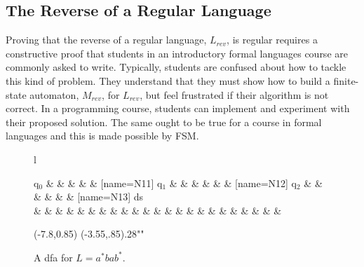 \documentclass{eptcs}
\begin{document}
\subsection{The Reverse of a Regular Language}
Proving that the reverse of a regular language, $L_{rev}$, is regular requires a constructive proof that students in an introductory formal languages course are commonly asked to write. Typically, students are confused about how to tackle this kind of problem. They understand that they must show how to build a finite-state automaton, $M_{rev}$, for $L_{rev}$, but feel frustrated if their algorithm is not correct. In a programming course, students can implement and experiment with their proposed solution. The same ought to be true for a course in formal languages and this is made possible by \textsf{FSM}.

\newcommand{\reverse}{
\begin{psmatrix}[rowsep=.5cm,colsep=.2cm,mnode=circle,fillstyle=solid,fillcolor=LightBlue]
             [name=N10] q$_0$ & & & & &  [name=N11] q$_1$  & & & & & &  [name=N12] q$_2$ & & & & & &  [name=N13] ds \\
             & & & & & & & & & & & & & & & & & & & & & & &
\end{psmatrix}

}
\begin{figure}[t]
\begin{center}
\begin{tabular}{l}
  \reverse
  \rput(-7.8,0.85){\psframebox*[framearc=.1]{$>$}}
  \cnode(-3.55,.85){.28}{""}

\end{tabular}
\caption{A \textsf{dfa} for $L = a^*bab^*$.}
\label{Ldfsa}
\end{center}
\end{figure}

\newcommand{\reversec}{
\begin{psmatrix}[rowsep=.7cm,colsep=.2cm,mnode=circle,fillstyle=solid,fillcolor=LightBlue]
             & & & & [name=N14] $S_n$ \\
             & & & & [name=N18] q$_0$ & & & & &  [name=N17] q$_1$  & & & & & &  [name=N15] q$_2$ & & & & [name=N16] ds \\
             & & & & & & & & & & & & & & & & & & & & & & &
\end{psmatrix}

\psset{arrows=->,linecolor=black,arcangle=30,arrowsize=4pt
2,labelsep=2pt}}
\end{document}
